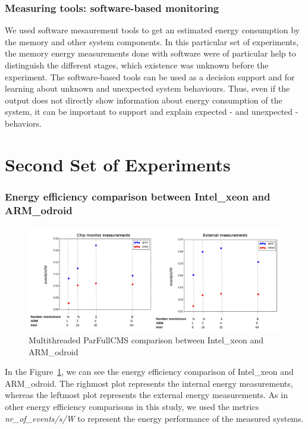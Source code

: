 \subsubsection*{Measuring tools: software-based monitoring}
We used software mesaurement tools to get an estimated energy consumption by the memory and other system components. In this particular set of experiments, the memory energy measurements done with software were
of particular help to distinguish the different stages, which existence was
unknown before the experiment. The software-based tools can be used as a 
decision support and for learning about unknown and unexpected system behaviours. Thus, even if the output
does not directly show information about energy consumption of the system, it
can be important to support and explain expected - and unexpected - behaviors.
  

\section{Second Set of Experiments}
\subsubsection*{Energy efficiency comparison between Intel\_xeon and ARM\_odroid}

\begin{figure}[h]
  \centering
    \includegraphics[width=150mm]{"img/acat/results1"}
    \caption{Multithreaded ParFullCMS comparison between Intel\_xeon and ARM\_odroid}
    \label{fig:parfull_results}
\end{figure}

In the Figure~\ref{fig:parfull_results}, we can see the energy efficiency comparison of Intel\_xeon and ARM\_odroid. The righmost plot represents the internal energy measurements, whereas the leftmost plot represents the external energy measurements. As in other energy efficiency comparisons in this study, we used the metrics \textit{nr\_of\_events/s/W} to represent the energy performance of the measured systems. 



